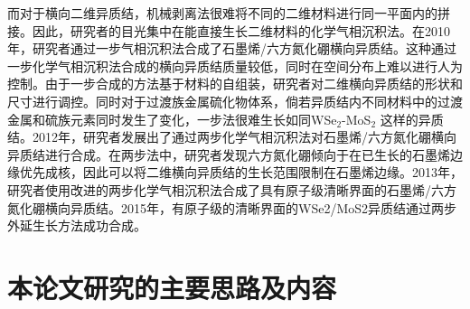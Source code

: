 而对于横向二维异质结，机械剥离法很难将不同的二维材料进行同一平面内的拼接。因此，研究者的目光集中在能直接生长二维材料的化学气相沉积法。在2010年，研究者通过一步气相沉积法合成了石墨烯/六方氮化硼横向异质结。这种通过一步化学气相沉积法合成的横向异质结质量较低，同时在空间分布上难以进行人为控制。由于一步合成的方法基于材料的自组装，研究者对二维横向异质结的形状和尺寸进行调控。同时对于过渡族金属硫化物体系，倘若异质结内不同材料中的过渡金属和硫族元素同时发生了变化，一步法很难生长如同WSe$_2$-MoS$_2$ 这样的异质结。2012年，研究者发展出了通过两步化学气相沉积法对石墨烯/六方氮化硼横向异质结进行合成。在两步法中，研究者发现六方氮化硼倾向于在已生长的石墨烯边缘优先成核，因此可以将二维横向异质结的生长范围限制在石墨烯边缘。2013年，研究者使用改进的两步化学气相沉积法合成了具有原子级清晰界面的石墨烯/六方氮化硼横向异质结。2015年，有原子级的清晰界面的WSe2/MoS2异质结通过两步外延生长方法成功合成。

\section{本论文研究的主要思路及内容}
